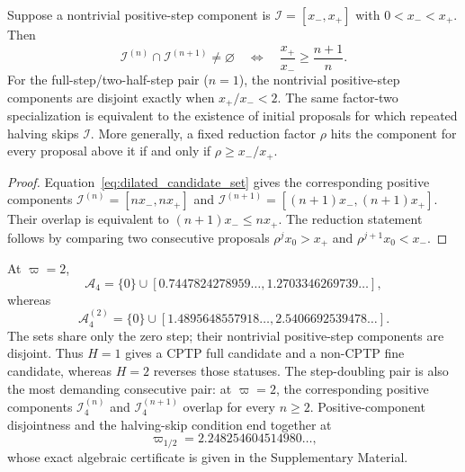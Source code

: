 \begin{proposition}
\label{prop:substep_ladder}
Suppose a nontrivial positive-step component is $\mathcal I=[x_-,x_+]$ with $0<x_-<x_+$. Then
\begin{equation}
 \mathcal I^{(n)}\cap\mathcal I^{(n+1)}\ne\varnothing
 \quad\Longleftrightarrow\quad
 \frac{x_+}{x_-}\ge\frac{n+1}{n}.
 \label{eq:ladder_overlap}
\end{equation}
For the full-step/two-half-step pair ($n=1$), the nontrivial positive-step components are disjoint exactly when $x_+/x_-<2$. The same factor-two specialization is equivalent to the existence of initial proposals for which repeated halving skips $\mathcal I$. More generally, a fixed reduction factor $\rho$ hits the component for every proposal above it if and only if $\rho\ge x_-/x_+$.
\end{proposition}

\begin{proof}
Equation~\eqref{eq:dilated_candidate_set} gives the corresponding positive components $\mathcal I^{(n)}=[nx_-,nx_+]$ and $\mathcal I^{(n+1)}=[(n+1)x_-,(n+1)x_+]$. Their overlap is equivalent to $(n+1)x_-\le nx_+$. The reduction statement follows by comparing two consecutive proposals $\rho^jx_0>x_+$ and $\rho^{j+1}x_0<x_-$.
\end{proof}

At $\varpi=2$,
\begin{equation}
 \mathcal A_4=\{0\}\cup[0.7447824278959\ldots,1.2703346269739\ldots],
 \label{eq:direct_varpi2_interval}
\end{equation}
whereas
\begin{equation}
 \mathcal A_4^{(2)}=\{0\}\cup[1.4895648557918\ldots,2.5406692539478\ldots].
 \label{eq:fine_varpi2_interval}
\end{equation}
The sets share only the zero step; their nontrivial positive-step components are disjoint. Thus $H=1$ gives a CPTP full candidate and a non-CPTP fine candidate, whereas $H=2$ reverses those statuses. The step-doubling pair is also the most demanding consecutive pair: at $\varpi=2$, the corresponding positive components $\mathcal I_4^{(n)}$ and $\mathcal I_4^{(n+1)}$ overlap for every $n\ge2$. Positive-component disjointness and the halving-skip condition end together at
\begin{equation}
 \varpi_{1/2}=2.248254604514980\ldots,
 \label{eq:halving_threshold}
\end{equation}
whose exact algebraic certificate is given in the Supplementary Material.

